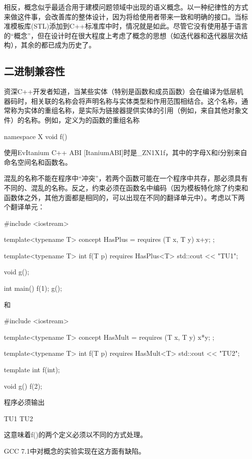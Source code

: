 相反，概念似乎最适合用于建模问题领域中出现的语义概念。以一种纪律性的方式来做这件事，会改善库的整体设计，因为将给使用者带来一致和明确的接口。当标准模板库(STL)添加到C++标准库中时，情况就是如此。尽管它没有使用基于语言的“概念”，但在设计时在很大程度上考虑了概念的思想（如迭代器和迭代器层次结构），其余的都已成为历史了。

\subsection{二进制兼容性}

资深C++开发者知道，当某些实体（特别是函数和成员函数）会在编译为低层机器码时，相关联的名称会将声明名称与实体类型和作用范围相结合。这个名称，通常称为实体的重组名称，是实际为链接器提供实体的引用（例如，来自其他对象文件）的名称。例如，定义为的函数的重组名称

\begin{cpp}
namespace X {
	void f() {}
}
\end{cpp}

使用EvItanium C++ ABI [ItaniumABI]时是\_ZN1X1f，其中的字母X和f分别来自命名空间名和函数名。

混乱的名称不能在程序中“冲突”，若两个函数可能在一个程序中共存，那必须具有不同的、混乱的名称。反之，约束必须在函数名中编码（因为模板特化除了约束和函数体之外，其他方面都是相同的，可以出现在不同的翻译单元中）。考虑以下两个翻译单元：

\begin{cpp}
#include <iostream>

template<typename T>
concept HasPlus = requires (T x, T y) {
	x+y;
};

template<typename T> int f(T p) requires HasPlus<T> {
	std::cout << "TU1\n";
}

void g();

int main() {
	f(1);
	g();
}
\end{cpp}

和

\begin{cpp}
#include <iostream>

template<typename T>
concept HasMult = requires (T x, T y) {
	x*y;
};

template<typename T> int f(T p) requires HasMult<T> {
	std::cout << "TU2\n";
}

template int f(int);

void g() {
	f(2);
}
\end{cpp}

程序必须输出

\begin{shell}
TU1
TU2
\end{shell}

这意味着f()的两个定义必须以不同的方式处理。

\begin{notice}
GCC 7.1中对概念的实验实现在这方面有缺陷。
\end{notice}























